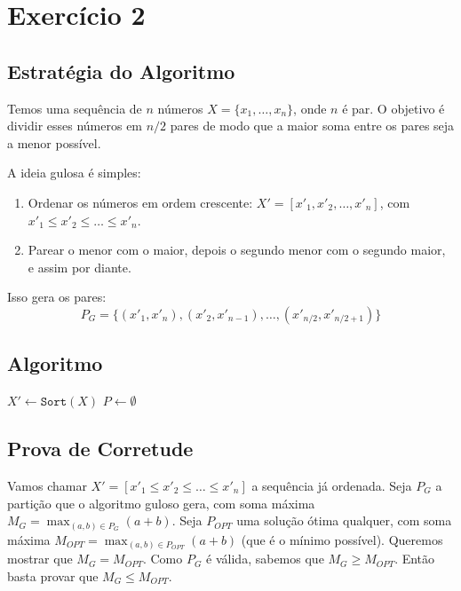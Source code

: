 \documentclass[a4paper,12pt]{article}
\begin{document}
\section*{Exercício 2}

\subsection*{Estratégia do Algoritmo}
Temos uma sequência de $n$ números $X = \{x_1, \dots, x_n\}$, onde $n$ é par. O objetivo é dividir esses números em $n/2$ pares de modo que a maior soma entre os pares seja a menor possível.

A ideia gulosa é simples:
\begin{enumerate}
    \item Ordenar os números em ordem crescente: $X' = [x'_1, x'_2, \dots, x'_n]$, com $x'_1 \le x'_2 \le \dots \le x'_n$.
    \item Parear o menor com o maior, depois o segundo menor com o segundo maior, e assim por diante.
\end{enumerate}
Isso gera os pares:
$$ P_G = \{(x'_1, x'_n), (x'_2, x'_{n-1}), \dots, (x'_{n/2}, x'_{n/2 + 1}) \} $$

\subsection*{Algoritmo}
\begin{algorithm}[H]
\SetAlgoLined
\caption{\texttt{MinimizaSomaMaximaDosPares}$(X, n)$}
\BlankLine
$X' \leftarrow \texttt{Sort}(X)$ 
$P \leftarrow \emptyset$ 
\;
\end{algorithm}

\subsection*{Prova de Corretude}
Vamos chamar $X' = [x'_1 \le x'_2 \le \dots \le x'_n]$ a sequência já ordenada.
Seja $P_G$ a partição que o algoritmo guloso gera, com soma máxima $M_G = \max_{(a,b) \in P_G} (a+b)$.
Seja $P_{OPT}$ uma solução ótima qualquer, com soma máxima $M_{OPT} = \max_{(a,b) \in P_{OPT}} (a+b)$ (que é o mínimo possível).
Queremos mostrar que $M_G = M_{OPT}$. Como $P_G$ é válida, sabemos que $M_G \ge M_{OPT}$. Então basta provar que $M_G \le M_{OPT}$.
\end{document}
